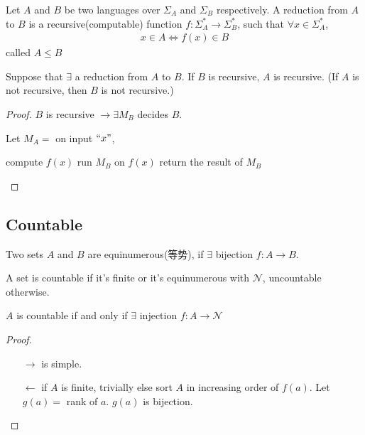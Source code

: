 \begin{definition}
    Let $A$ and $B$ be two languages over $\Sigma_A$ and $\Sigma_B$ respectively. A reduction from $A$ to $B$ is a recursive(computable) function $f:\Sigma_A^*\to\Sigma_B^*$, such that $\forall x\in\Sigma_A^*$,
    \begin{align*}
        x\in A \iff f(x) \in B
    \end{align*}
    called $A\le B$
\end{definition}

\begin{theorem}
    Suppose that $\exists$ a reduction from $A$ to $B$. If $B$ is recursive, $A$ is recursive. (If $A$ is not recursive, then $B$ is not recursive.)
\end{theorem}
\begin{proof}
    $B$ is recursive $\to\exists M_B$ decides $B$. 

    Let $M_A=$ on input $``x"$,
    \begin{algorithm}[H]
        \caption{$M_A$}
        \begin{algorithmic}
            \State compute $f(x)$
            \State run $M_B$ on $f(x)$
            \State return the result of $M_B$
        \end{algorithmic}
    \end{algorithm}
\end{proof}

\subsection{Countable}

\begin{definition}
    Two sets $A$ and $B$ are equinumerous(等势), if $\exists$ bijection $f:A\to B$. 

    A set is countable if it's finite or it's equinumerous with $\mathcal{N}$, uncountable otherwise. 
\end{definition}

\begin{lemma}
    $A$ is countable if and only if $\exists$ injection $f:A\to \mathcal{N}$
\end{lemma}
\begin{proof}\quad

    \begin{enumerate}
        \item [$\to$] is simple. 
        \item [$\leftarrow$] if $A$ is finite, trivially
        \subitem else sort $A$ in increasing order of $f(a)$. Let $g(a)=$ rank of $a$. $g(a)$ is bijection. 
    \end{enumerate}
\end{proof}

